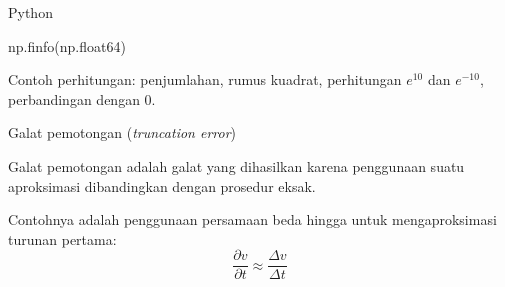 \begin{frame}{Python}

np.finfo(np.float64)

Contoh perhitungan: penjumlahan, rumus kuadrat, perhitungan $e^{10}$
dan $e^{-10}$, perbandingan dengan 0.

\end{frame}


\begin{frame}{Galat pemotongan (\textit{truncation error})}

Galat pemotongan adalah galat yang dihasilkan karena penggunaan
suatu aproksimasi dibandingkan dengan prosedur eksak.

Contohnya adalah penggunaan persamaan beda hingga untuk mengaproksimasi
turunan pertama:
$$
\frac{\partial v}{\partial t} \approx \frac{\Delta v}{\Delta t}
$$

\end{frame}





